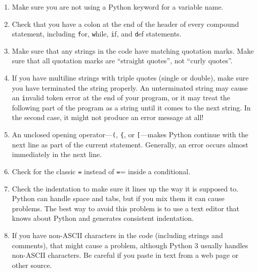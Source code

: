 \documentclass[
DIV=11,
fontsize=13,
twoside,
headinclude=false,
titlepage=firstiscover,
abstract=true,
headsepline=true,
footsepline=true,
chapterprefix=true, %
headings=big,
bibliography=totoc,%
captions=tableheading
]{scrbook}
\theoremstyle{definition}
\begin{document}
\begin{enumerate}

\item Make sure you are not using a Python keyword for a variable name.

\item Check that you have a colon at the end of the header of every
compound statement, including {\texttt for}, {\texttt while},
{\texttt if}, and {\texttt def} statements.

\item Make sure that any strings in the code have matching
quotation marks.  Make sure that all quotation marks are
``straight quotes'', not ``curly quotes''.

\item If you have multiline strings with triple quotes (single or double), make
sure you have terminated the string properly.  An unterminated string
may cause an {\texttt invalid token} error at the end of your program,
or it may treat the following part of the program as a string until it
comes to the next string.  In the second case, it might not produce an error
message at all!

\item An unclosed opening operator---\verb+(+, \verb+{+, or
  \verb+[+---makes Python continue with the next line as part of the
  current statement.  Generally, an error occurs almost immediately in
  the next line.

\item Check for the classic {\texttt =} instead of {\texttt ==} inside
a conditional.

\item Check the indentation to make sure it lines up the way it
is supposed to.  Python can handle space and tabs, but if you mix
them it can cause problems.  The best way to avoid this problem
is to use a text editor that knows about Python and generates
consistent indentation.

\item If you have non-ASCII characters in the code (including strings
and comments), that might cause a problem, although Python 3 usually
handles non-ASCII characters.  Be careful if you paste in text from
a web page or other source.

\end{enumerate}
\end{document}
